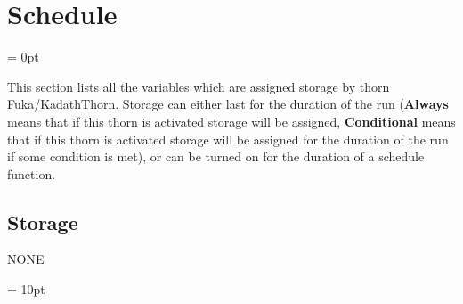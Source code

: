 
\section{Schedule} 


\parskip = 0pt


\noindent This section lists all the variables which are assigned storage by thorn Fuka/KadathThorn.  Storage can either last for the duration of the run ({\bf Always} means that if this thorn is activated storage will be assigned, {\bf Conditional} means that if this thorn is activated storage will be assigned for the duration of the run if some condition is met), or can be turned on for the duration of a schedule function.


\subsection*{Storage}NONE

\vspace{5mm}\parskip = 10pt 
